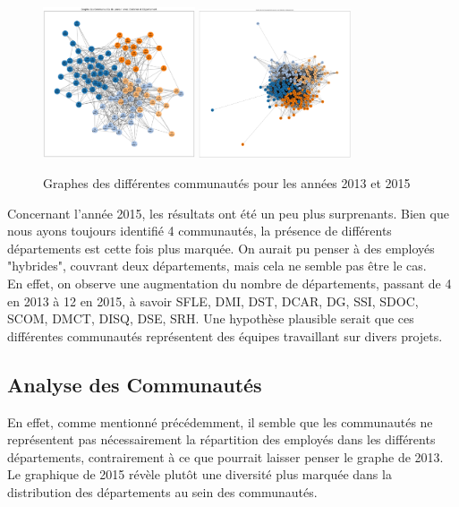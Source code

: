 \documentclass{article}
\begin{document}
\begin{figure}[!h]
    \centering
    \includegraphics[width=0.40\textwidth]{assets/communaute/communaute_2013.png}
    \hfill
    \includegraphics[width=0.40\textwidth]{assets/communaute/communaute_2015.png}
    \caption{Graphes des différentes communautés pour les années 2013 et 2015}
    \label{fig:communaute_parallel}
\end{figure}


Concernant l'année 2015, les résultats ont été un peu plus surprenants. Bien que nous ayons toujours identifié 4 communautés, la présence de différents départements est cette fois plus marquée. On aurait pu penser à des employés "hybrides", couvrant deux départements, mais cela ne semble pas être le cas. \\

En effet, on observe une augmentation du nombre de départements, passant de 4 en 2013 à 12 en 2015, à savoir SFLE, DMI, DST, DCAR, DG, SSI, SDOC, SCOM, DMCT, DISQ, DSE, SRH. Une hypothèse plausible serait que ces différentes communautés représentent des équipes travaillant sur divers projets. \\

\subsection{Analyse des Communautés}

En effet, comme mentionné précédemment, il semble que les communautés ne représentent pas nécessairement la répartition des employés dans les différents départements, contrairement à ce que pourrait laisser penser le graphe de 2013. Le graphique de 2015 révèle plutôt une diversité plus marquée dans la distribution des départements au sein des communautés. \\
\end{document}
